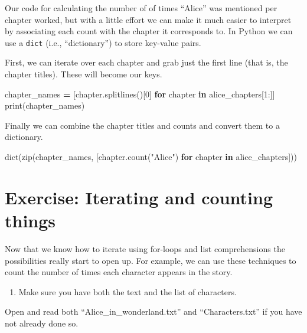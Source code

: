 \documentclass[]{book}
\newenvironment{Shaded}{\begin{snugshade}}{\end{snugshade}}
\newcommand{\KeywordTok}[1]{\textcolor[rgb]{0.13,0.29,0.53}{\textbf{#1}}}
\newcommand{\DecValTok}[1]{\textcolor[rgb]{0.00,0.00,0.81}{#1}}
\newcommand{\StringTok}[1]{\textcolor[rgb]{0.31,0.60,0.02}{#1}}
\newcommand{\ControlFlowTok}[1]{\textcolor[rgb]{0.13,0.29,0.53}{\textbf{#1}}}
\newcommand{\OperatorTok}[1]{\textcolor[rgb]{0.81,0.36,0.00}{\textbf{#1}}}
\newcommand{\BuiltInTok}[1]{#1}
\newcommand{\NormalTok}[1]{#1}
\providecommand{\tightlist}{%
  \setlength{\itemsep}{0pt}\setlength{\parskip}{0pt}}
\begin{document}
Our code for calculating the number of of times ``Alice'' was mentioned
per chapter worked, but with a little effort we can make it much easier
to interpret by associating each count with the chapter it corresponds
to. In Python we can use a \texttt{dict} (i.e., ``dictionary'') to store
key-value pairs.

First, we can iterate over each chapter and grab just the first line
(that is, the chapter titles). These will become our keys.

\begin{Shaded}
\begin{Highlighting}[]
\NormalTok{chapter_names }\OperatorTok{=}\NormalTok{ [chapter.splitlines()[}\DecValTok{0}\NormalTok{] }\ControlFlowTok{for}\NormalTok{ chapter }\KeywordTok{in}\NormalTok{ alice_chapters[}\DecValTok{1}\NormalTok{:]]}
\BuiltInTok{print}\NormalTok{(chapter_names)}
\end{Highlighting}
\end{Shaded}

Finally we can combine the chapter titles and counts and convert them to
a dictionary.

\begin{Shaded}
\begin{Highlighting}[]
\BuiltInTok{dict}\NormalTok{(}\BuiltInTok{zip}\NormalTok{(chapter_names, }
\NormalTok{         [chapter.count(}\StringTok{"Alice"}\NormalTok{) }
          \ControlFlowTok{for}\NormalTok{ chapter }\KeywordTok{in}\NormalTok{ alice_chapters]))}
\end{Highlighting}
\end{Shaded}

\section{Exercise: Iterating and counting
things}\label{exercise-iterating-and-counting-things}

Now that we know how to iterate using for-loops and list comprehensions
the possibilities really start to open up. For example, we can use these
techniques to count the number of times each character appears in the
story.

\begin{enumerate}
\def\labelenumi{\arabic{enumi}.}
\tightlist
\item
  Make sure you have both the text and the list of characters.
\end{enumerate}

Open and read both ``Alice\_in\_wonderland.txt'' and ``Characters.txt''
if you have not already done so.
\end{document}
